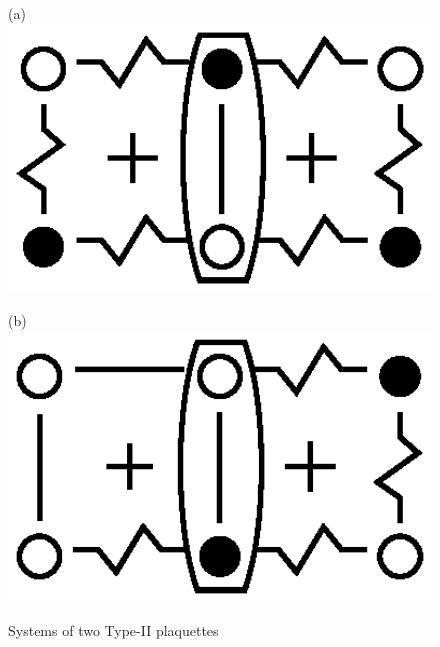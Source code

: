 \documentclass[utf8, babel, sor, jor, amsmath, amssymb, reprint]{elsarticle} %
\begin{document}
\begin{figure}[H]
	\centering
	\begin{minipage}{0.2\textwidth}
		\centering
		(a)
		\includegraphics[width=1\textwidth]{pictures/Type2_3x2.eps}
		\label{fig:Type2_3x2}
	\end{minipage}
	\hspace{20pt}
	\begin{minipage}{0.2\textwidth}
		\centering
		(b)
		\includegraphics[width=1\textwidth]{pictures/Type2_3x2_2.eps}
		\label{fig:Type2_3x2_2}
	\end{minipage}
	\caption{Systems of two Type-II plaquettes}
	\label{fig:Type2_32}
\end{figure}
\end{document}
